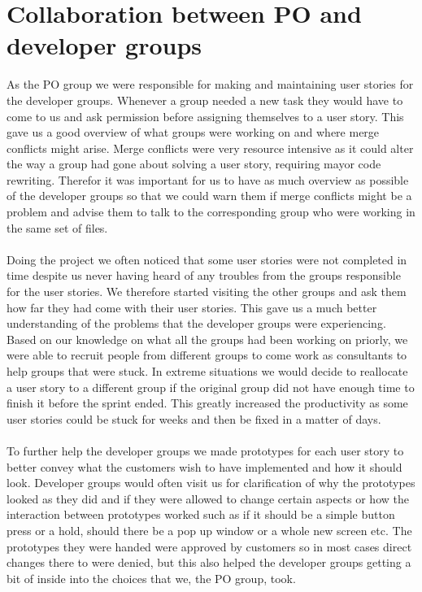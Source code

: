 \section{Collaboration between PO and developer groups}
As the PO group we were responsible for making and maintaining user stories for the developer groups.
Whenever a group needed a new task they would have to come to us and ask permission before assigning themselves to a user story.
This gave us a good overview of what groups were working on and where merge conflicts might arise.
Merge conflicts were very resource intensive as it could alter the way a group had gone about solving a user story, requiring mayor code rewriting.
Therefor it was important for us to have as much overview as possible of the developer groups so that we could warn them if merge conflicts might be a problem and advise them to talk to the corresponding group who were working in the same set of files.
\\
\\
Doing the project we often noticed that some user stories were not completed in time despite us never having heard of any troubles from the groups responsible for the user stories.
We therefore started visiting the other groups and ask them how far they had come with their user stories.
This gave us a much better understanding of the problems that the developer groups were experiencing. 
Based on our knowledge on what all the groups had been working on priorly, we were able to recruit people from different groups to come work as consultants to help groups that were stuck.
In extreme situations we would decide to reallocate a user story to a different group if the original group did not have enough time to finish it before the sprint ended.
This greatly increased the productivity as some user stories could be stuck for weeks and then be fixed in a matter of days.
\\
\\
To further help the developer groups we made prototypes for each user story to better convey what the customers wish to have implemented and how it should look.
Developer groups would often visit us for clarification of why the prototypes looked as they did and if they were allowed to change certain aspects or how the interaction between prototypes worked such as if it should be a simple button press or a hold, should there be a pop up window or a whole new screen etc.
The prototypes they were handed were approved by customers so in most cases direct changes there to were denied, but this also helped the developer groups getting a bit of inside into the choices that we, the PO group, took.
